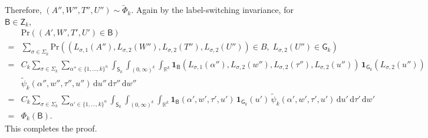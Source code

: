 \documentclass[12pt]{article}
\newcommand{\df}{\mathrm{d}}
\newcommand{\Z}{\mathsf{Z}}
\newcommand{\ind}{\mathbf{1}}
\begin{document}
Therefore, $(A'', W'', T'', U'') \sim \tilde{\Phi}_k$.
Again by the label-switching invariance, for $\mathsf{B} \in \Z_k$,
\[
\begin{aligned}
	& \mbox{Pr}((A',W',T',U') \in \mathsf{B}) \\
	=& \sum_{\sigma \in \Sigma_k} \mbox{Pr} ( (L_{\sigma,1}(A''), L_{\sigma,2}(W''), L_{\sigma,2}(T''), L_{\sigma,2}(U'')) \in B, \; L_{\sigma,2}(U'') \in \mathsf{G}_k ) \\
	=& C_k \sum_{\sigma \in \Sigma_k} \sum_{\alpha'' \in \{1,\dots,k\}^n} \int_{\mathsf{S}_k} \int_{(0,\infty)^k} \int_{\mathbb{R}^k} \ind_{\mathsf{B}}(L_{\sigma,1}(\alpha''), L_{\sigma,2}(w''), L_{\sigma,2}(\tau''), L_{\sigma,2}(u'') ) \, \ind_{\mathsf{G}_k}(L_{\sigma,2}(u'')) \\
	& \tilde{\psi}_k(\alpha'', w'', \tau'', u'') \, \df u'' \, \df \tau'' \, \df w'' \\
	=& C_k \sum_{\sigma \in \Sigma_k} \sum_{\alpha' \in \{1,\dots,k\}^n} \int_{\mathsf{S}_k} \int_{(0,\infty)^k} \int_{\mathbb{R}^k} \ind_{\mathsf{B}} (\alpha', w', \tau', u') \, \ind_{\mathsf{G}_k}(u') \, \tilde{\psi}_k(\alpha', w', \tau', u') \, \df u' \, \df \tau' \, \df w' \\
	=& \Phi_k(\mathsf{B}).
\end{aligned}
\]
This completes the proof.
\end{document}
